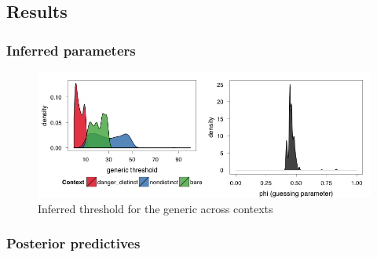 \documentclass[10pt,letterpaper]{article}
\begin{document}
%
%

\subsection{Results}

\subsubsection{Inferred parameters}

\begin{figure}
\centering
    \includegraphics[width=\columnwidth]{fig2_bda1_combined}
    \caption{Inferred threshold for the generic across contexts}
  \label{fig:bda1a}
\end{figure}


\subsubsection{Posterior predictives}
\end{document}
